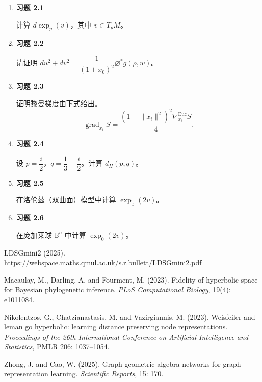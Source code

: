 \begin{enumerate}[itemsep=.55\baselineskip]
  \item \textbf{习题 2.1}\par\nopagebreak
  计算 $d\exp_p(v)$，其中 $v\in T_pM$。
  \item \textbf{习题 2.2}\par\nopagebreak
  请证明 $du^2+dv^2=\dfrac{1}{(1+x_0)^2}\varnothing^*g(\rho,w)$。
  \item \textbf{习题 2.3}\par\nopagebreak
  证明黎曼梯度由下式给出。
  \[
    \operatorname{grad}_{x_i}S
      =\frac{(1-\lVert x_i\rVert^2)^2\nabla^{\mathrm{Euc}}_{x_i}S}{4}.
  \]
  \item \textbf{习题 2.4}\par\nopagebreak
  设 $p=\dfrac{i}{2}$，$q=\dfrac13+\dfrac{i}{2}$。计算 $d_H(p,q)$。
  \item \textbf{习题 2.5}\par\nopagebreak
  在洛伦兹（双曲面）模型中计算 $\exp_x(2v)$。
  \item \textbf{习题 2.6}\par\nopagebreak
  在庞加莱球 $\mathbb B^n$ 中计算 $\exp_0(2v)$。
\end{enumerate}

\begin{bookreferences}
  \item LDSGmini2 (2025). \url{https://webspace.maths.qmul.ac.uk/s.r.bullett/LDSGmini2.pdf}
  \item Macaulay, M., Darling, A. and Fourment, M. (2023). Fidelity of hyperbolic space for Bayesian phylogenetic inference. \emph{PLoS Computational Biology}, 19(4): e1011084.
  \item Nikolentzos, G., Chatzianastasis, M. and Vazirgiannis, M. (2023). Weisfeiler and leman go hyperbolic: learning distance preserving node representations. \emph{Proceedings of the 26th International Conference on Artificial Intelligence and Statistics}, PMLR 206: 1037–1054.
  \item Zhong, J. and Cao, W. (2025). Graph geometric algebra networks for graph representation learning. \emph{Scientific Reports}, 15: 170.
\end{bookreferences}
